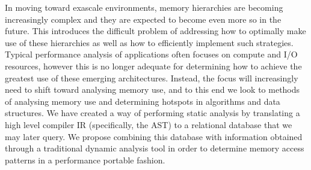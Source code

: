 In moving toward exascale environments, memory hierarchies are becoming increasingly complex and they are expected to become even more so in the future.
This introduces the difficult problem of addressing how to optimally make use of these hierarchies as well as how to efficiently implement such strategies.
Typical performance analysis of applications often focuses on compute and I/O resources, however this is no longer adequate for determining how to achieve the greatest use of these emerging architectures.
Instead, the focus will increasingly need to shift toward analysing memory use, and to this end we look to methods of analysing memory use and determining hotspots in algorithms and data structures.
We have created a way of performing static analysis by translating a high level compiler \acl{IR} (specifically, the \acl{AST}) to a relational database that we may later query.
We propose combining this database with information obtained through a traditional dynamic analysis tool in order to determine memory access patterns in a performance portable fashion.

